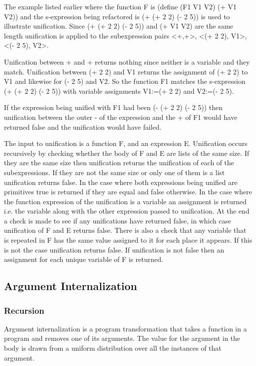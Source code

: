 \documentclass[a4paper,10pt]{article}
\begin{document}
The example listed earlier where the function F is (define (F1 V1 V2) (+ V1 V2)) and the s-expression being refactored is (+ (+ 2 2) (- 2 5)) is used to illustrate unification.  Since (+ (+ 2 2) (- 2 5)) and (+ V1 V2) are the same length unification is applied to the subexpression pairs <+,+>, <(+ 2 2), V1>, <(- 2 5), V2>.

Unification between + and + returns nothing since neither is a variable and they match.  Unification between (+ 2 2) and V1 returns the assignment of (+ 2 2) to V1 and likewise for (- 2 5) and V2.  So the function F1 matches the s-expression (+ (+ 2 2) (- 2 5)) with variable assignments V1:=(+ 2 2) and V2:=(- 2 5).

If the expression being unified with F1 had been (- (+ 2 2) (- 2 5)) then unification between the outer - of the expression and the + of F1 would have returned false and the unification would have failed.

The input to unification is a function F, and an expression E.  Unification occurs recursively by checking whether the body of F and E are lists of the same size.  If they are the same size then unification returns the unification of each of the subexpressions.  If they are not the same size or only one of them is a list unification returns false.  In the case where both expressions being unified are primitives true is returned if they are equal and false otherwise.  In the case where the function expression of the unification is a variable an assignment is returned i.e. the variable along with the other expression passed to unification.  At the end a check is made to see if any unifications have returned false, in which case unification of F and E returns false.  There is also a check that any variable that is repeated in F has the same value assigned to it for each place it appears.  If this is not the case unification returns false. If unification is not false then an assignment for each unique variable of F is returned.

\subsection{Argument Internalization}
\subsubsection{Recursion}
Argument internalization is a program transformation that takes a function in a program and removes one of its arguments.  The value for the argument in the body is drawn from a uniform distribution over all the instances of that argument.
\end{document}
